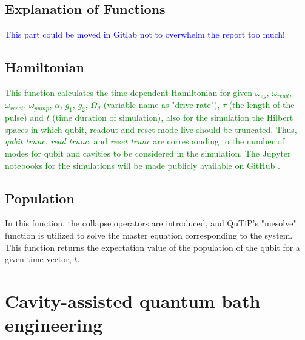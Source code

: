 \subsection{Explanation of Functions}

\textcolor{blue}{This part could be moved in Gitlab not to overwhelm the report too much!}

\subsection{ Hamiltonian}
\textcolor{green}{This function calculates the time dependent Hamiltonian for given $\omega_{eg}$, $\omega_{read}$, $\omega_{reset}$, $\omega_{pump}$, $\alpha$, $g_1$, $g_2$, $\Omega_{d}$ (variable name as "drive rate"), $\tau$ (the length of the pulse) and $t$ (time duration of simulation), also for the simulation the  Hilbert spaces in which qubit, readout and reset mode live should be truncated. Thus, \emph{qubit trunc}, \emph{read trunc}, and \emph{reset trunc} are corresponding to the number of modes for qubit and cavities to be considered in the simulation. The Jupyter notebooks for the simulations will be made publicly available on GitHub \cite{OUR GITLAB}.
}

\subsection{Population}

In this function, the collapse operators are introduced, and QuTiP's "mesolve" function is utilized to solve the master equation corresponding to the system. This function returns the expectation value of the population of the qubit for a given time vector, $t$.







\section{Cavity-assisted quantum bath engineering}

\subsection{}